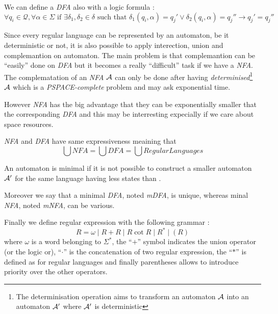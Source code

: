 We can define a \textit{DFA} also with a logic formula :
\[\forall q_i \in \mathcal{Q}, \forall \alpha \in \Sigma \text{ if } \exists \delta_1, \delta_2 \in \delta \text{ such that } \delta_1(q_i, \alpha) = q_j' \vee \delta_2(q_i, \alpha) = q_j'' \rightarrow q_j' = q_j'' \]

Since every regular language can be represented by an automaton, be it deterministic or not, it is also possible to apply interection, union and complemantion on automaton. The main problem is that complemantion can be ``easily'' done on \textit{DFA} but it becomes a really ``difficult'' task if we have a \textit{NFA}. The complematation of an \textit{NFA} $\mathcal{A}$ can only be done after having \textit{determinised}\footnote{The determinisation operation aims to transform an automaton $\mathcal{A}$ into an automaton $\mathcal{A}'$ where $\mathcal{A}'$ is deterministic} $\mathcal{A}$ which is a \textit{PSPACE-complete} problem and may ask exponential time.

However \textit{NFA} has the big advantage that they can be exponentially smaller that the corresponding \textit{DFA} and this may be interresting expecially if we care about space resources.

\begin{remark}
  \textit{NFA} and \textit{DFA} have same expressiveness meaining that \[\bigcup NFA = \bigcup DFA = \bigcup RegularLanguages\]
\end{remark}

\begin{definition}
  An automaton \automaton{} is minimal if it is not possible to construct a smaller automaton $\mathcal{A}{}'$ for the same language having less states than \automaton{}.
\end{definition}

Moreover we say that a minimal \textit{DFA}, noted \textit{mDFA}, is unique, whereas minal \textit{NFA}, noted \textit{mNFA}, can be various.

Finally we define regular expression with the following grammar :
\[R = \omega \mid R + R \mid R \cot R \mid R^* \mid (R)\]
where $\omega$ is a word belonging to $\Sigma^*$, the ``$+$'' symbol indicates the union operator (or the logic or), ``$\cdot$'' is the concatenation of two regular expression, the ``$*$'' is defined as for regular languages and finally parentheses allows to introduce priority over the other operators.

